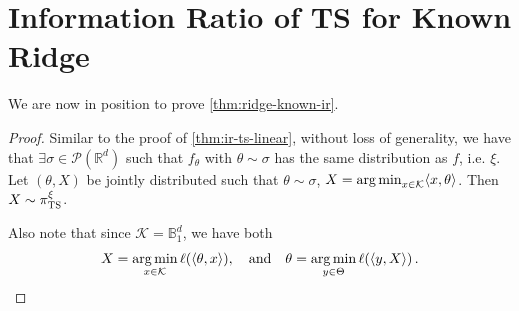 \documentclass[letter, 12pt]{report}
\newcommand{\R}{\mathbb R}
\newcommand{\argmin}{\operatornamewithlimits{arg\,min}}
\newcommand{\ball}{\mathbb{B}}
\newcommand{\cK}{\mathcal K}
\newcommand{\cP}{\mathcal P}
\newcommand{\1}{\mathbf{1}}
\newcommand{\ts}{\textsc{TS}\xspace}
\theoremstyle{plain}
\theoremstyle{definition}
\theoremstyle{remark}
\begin{document}
\section{Information Ratio of \ts for Known Ridge}
We are now in position to prove \cref{thm:ridge-known-ir}.
\KnownRidgeLemma
\begin{proof}
    Similar to the proof of \cref{thm:ir-ts-linear},
    without loss of generality, we have that $\exists \sigma \in \cP(\R^d)$
    such that $f_\theta$ with $\theta \sim \sigma$ has the same distribution as $f$, i.e. $\xi$.
    Let $(\theta, X)$ be jointly distributed such that $\theta \sim \sigma$, $X = \argmin_{x \in \cK} \langle x, \theta\rangle$.
    Then $X \sim \pi_\ts^\xi$.

    Also note that since $\cK = \ball_1^d$, we have both
    \begin{align}
        X = \argmin_{x \in \cK} \ell(\langle \theta, x \rangle),\quad \text{and} \quad
        \theta = \argmin_{y \in \Theta} \ell(\langle y, X \rangle)\,.
        \label{eq:double-greedy}
    \end{align}


\end{proof}
\end{document}
